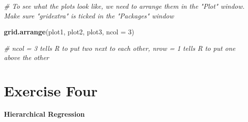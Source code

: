 \documentclass[
]{book}
\newenvironment{Shaded}{\begin{snugshade}}{\end{snugshade}}
\newcommand{\AttributeTok}[1]{\textcolor[rgb]{0.13,0.29,0.53}{#1}}
\newcommand{\CommentTok}[1]{\textcolor[rgb]{0.56,0.35,0.01}{\textit{#1}}}
\newcommand{\DecValTok}[1]{\textcolor[rgb]{0.00,0.00,0.81}{#1}}
\newcommand{\FunctionTok}[1]{\textcolor[rgb]{0.13,0.29,0.53}{\textbf{#1}}}
\newcommand{\NormalTok}[1]{#1}
\let\oldsection\section
\renewcommand{\section}{\needspace{5\baselineskip}\oldsection}
\begin{document}
\begin{Shaded}
\begin{Highlighting}[]
\CommentTok{\# To see what the plots look like, we need to arrange them in the "Plot" window. Make sure "gridextra" is ticked in the "Packages" window}

\FunctionTok{grid.arrange}\NormalTok{(plot1, plot2, plot3, }\AttributeTok{ncol =} \DecValTok{3}\NormalTok{)}

\CommentTok{\# ncol = 3 tells R to put two next to each other, nrow = 1 tells R to put one above the other}
\end{Highlighting}
\end{Shaded}

\section{Exercise Four}\label{exercise-four-2}

\textbf{Hierarchical Regression}
\end{document}
